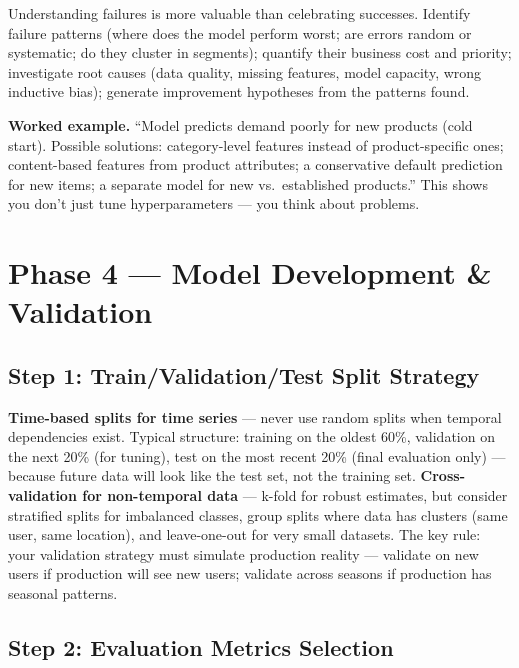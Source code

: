 Understanding failures is more valuable than celebrating successes. Identify failure patterns (where does the
model perform worst; are errors random or systematic; do they cluster in segments); quantify their business cost
and priority; investigate root causes (data quality, missing features, model capacity, wrong inductive bias);
generate improvement hypotheses from the patterns found.

\begin{example}
\textbf{Worked example.} ``Model predicts demand poorly for new products (cold start). Possible solutions:
category-level features instead of product-specific ones; content-based features from product attributes; a
conservative default prediction for new items; a separate model for new vs.\ established products.'' This shows
you don't just tune hyperparameters --- you think about problems.
\end{example}

\section{Phase 4 --- Model Development \& Validation}

\subsection{Step 1: Train/Validation/Test Split Strategy}

\textbf{Time-based splits for time series} --- never use random splits when temporal dependencies exist. Typical
structure: training on the oldest 60\%, validation on the next 20\% (for tuning), test on the most recent 20\%
(final evaluation only) --- because future data will look like the test set, not the training set.
\textbf{Cross-validation for non-temporal data} --- k-fold for robust estimates, but consider stratified splits
for imbalanced classes, group splits where data has clusters (same user, same location), and leave-one-out for
very small datasets. The key rule: your validation strategy must simulate production reality --- validate on new
users if production will see new users; validate across seasons if production has seasonal patterns.

\subsection{Step 2: Evaluation Metrics Selection}


